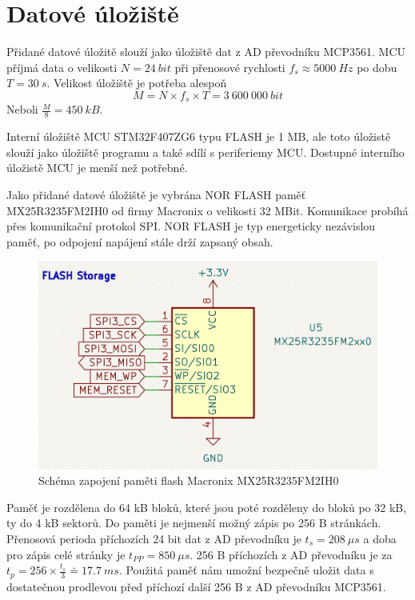 \section{Datové úložiště}
Přidané datové úložitě slouží jako úložiště dat z AD převodníku MCP3561. MCU příjmá data o velikosti $N = 24 \ bit$ při přenosové rychlosti $f_s \approx 5000 \ Hz$ po dobu $T = 30 \ s$. Velikost úložiště je potřeba alespoň
\begin{equation*}
    M = N \times f_s \times T = 3 \ 600 \ 000 \ bit
\end{equation*}
Neboli $\frac{M}{8} = 450 \ kB$.
\par
Interní úložiště MCU STM32F407ZG6 typu FLASH je 1 MB, ale toto úložistě slouží jako úložiště programu a také sdílí s periferiemy MCU. Dostupné interního úložistě MCU je menší než potřebné.
\par
Jako přidané datové úložiště je vybrána NOR FLASH paměť MX25R3235FM2IH0 od firmy Macronix o velikosti 32 MBit. Komunikace probíhá přes komunikační protokol SPI. NOR FLASH je typ energeticky nezávislou paměť, po odpojení napájení stále drží zapsaný obsah.
\begin{figure}[H]
    \label{fig:flash_memory}
    \caption{Schéma zapojení paměti flash Macronix MX25R3235FM2IH0}
    \includegraphics[width=1\textwidth]{pictures/flash_memory.jpg}
\end{figure}
Paměť je rozdělena do 64 kB bloků, které jsou poté rozděleny do bloků po 32 kB, ty do 4 kB sektorů. Do paměti je nejmenší možný zápis po 256 B stránkách. Přenosová perioda příchozích 24 bit dat z AD převodníku je $t_s = 208 \ \mu s$ a doba pro zápis celé stránky je $t_{PP} = 850 \ \mu s$. 256 B příchozích z AD převodníku je za $t_p = 256 \times \frac{t_s}{3} \doteq 17.7 \ ms$.
Použitá paměť nám umožní bezpečně uložit data s dostatečnou prodlevou před příchozí další 256 B z AD převodníku MCP3561.
